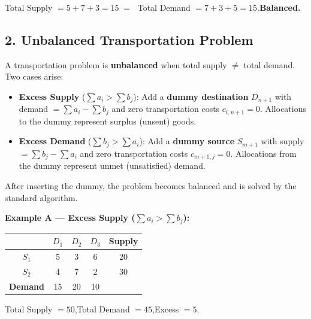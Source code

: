 \documentclass[12pt]{article}
\begin{document}
Total Supply $= 5+7+3 = 15\;=\;$ Total Demand $= 7+3+5 = 15$.\quad \textbf{Balanced.}

\vspace{10pt}

\subsection*{2. Unbalanced Transportation Problem}

\begin{defbox}
A transportation problem is \textbf{unbalanced} when total supply $\neq$ total demand. Two cases arise:

\begin{itemize}[leftmargin=*, itemsep=3pt]
  \item \textbf{Excess Supply} ($\sum a_i > \sum b_j$): Add a \textbf{dummy destination} $D_{n+1}$ with demand $= \sum a_i - \sum b_j$ and zero transportation costs $c_{i,n+1}=0$. Allocations to the dummy represent surplus (unsent) goods.
  \item \textbf{Excess Demand} ($\sum b_j > \sum a_i$): Add a \textbf{dummy source} $S_{m+1}$ with supply $= \sum b_j - \sum a_i$ and zero transportation costs $c_{m+1,j}=0$. Allocations from the dummy represent unmet (unsatisfied) demand.
\end{itemize}

After inserting the dummy, the problem becomes balanced and is solved by the standard algorithm.
\end{defbox}

\vspace{8pt}

\textbf{Example A --- Excess Supply ($\sum a_i > \sum b_j$):}

\begin{center}
\renewcommand{\arraystretch}{1.3}
\begin{tabular}{|c|c|c|c|c|}
  \hline
  \rowcolor{primary}
  {\color{white}} & {\color{white}$D_1$} & {\color{white}$D_2$} & {\color{white}$D_3$} & {\color{white}Supply} \\
  \hline
  \rowcolor{lightbg!50} $S_1$ & 5 & 3 & 6 & 20 \\
  \hline
  $S_2$ & 4 & 7 & 2 & 30 \\
  \hline
  \rowcolor{accent!20}\textbf{Demand} & 15 & 20 & 10 & \\
  \hline
\end{tabular}
\end{center}

Total Supply $= 50$,\quad Total Demand $= 45$,\quad Excess $= 5$.
\end{document}
